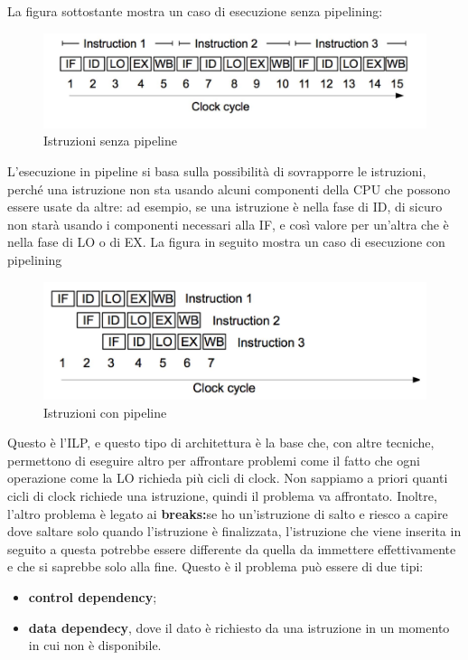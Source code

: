 \documentclass[12pt, oneside]{extbook}
\begin{document}
La figura sottostante mostra un caso di esecuzione senza pipelining:
\begin{figure}[ht!]
\includegraphics[scale=0.3]{immagini/no-pipeline}
\caption{Istruzioni senza pipeline}
\end{figure}
L'esecuzione in pipeline si basa sulla possibilità di sovrapporre le istruzioni, perché una istruzione non sta usando alcuni componenti della CPU che possono essere usate da altre: ad esempio, se una istruzione è nella fase di ID, di sicuro non starà usando i componenti necessari alla IF, e così valore per un'altra che è nella fase di LO o di EX. La figura in seguito mostra un caso di esecuzione con pipelining 
\begin{figure}[ht!]
\includegraphics[scale=0.3]{immagini/pipeline}
\caption{Istruzioni con pipeline}
\end{figure}
Questo è l'ILP, e questo tipo di architettura è la base che, con altre tecniche, permettono di eseguire altro per affrontare problemi come il fatto che ogni operazione come la LO richieda più cicli di clock. Non sappiamo a priori quanti cicli di clock richiede una istruzione, quindi il problema va affrontato. Inoltre, l'altro problema è legato ai \textbf{breaks:}se ho un'istruzione di salto e riesco a capire dove saltare solo quando l'istruzione è finalizzata, l'istruzione che viene inserita in seguito a questa potrebbe essere differente da quella da immettere effettivamente e che si saprebbe solo alla fine. Questo è il problema può essere di due tipi:
\begin{itemize}
\item \textbf{control dependency};
\item \textbf{data dependecy}, dove il dato è richiesto da una istruzione in un momento in cui non è disponibile.
\end{itemize} 
\end{document}
